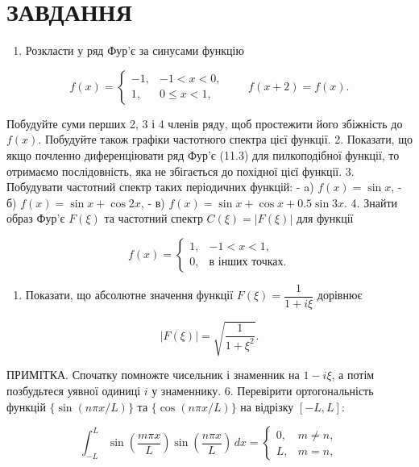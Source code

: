 \documentclass[
  ukrainian,
]{article}
\providecommand{\tightlist}{%
  \setlength{\itemsep}{0pt}\setlength{\parskip}{0pt}}
\begin{document}
\section{ЗАВДАННЯ}\label{ux437ux430ux432ux434ux430ux43dux43dux44f-9}

\begin{enumerate}
\def\labelenumi{\arabic{enumi}.}
\tightlist
\item
  Розкласти у ряд Фур'є за синусами функцію
\end{enumerate}

\[
f(x)=
\begin{cases}
-1, & -1 < x < 0,\\
1, & 0 \le x < 1,
\end{cases}
\qquad
f(x+2)=f(x).
\]

Побудуйте суми перших 2, 3 і 4 членів ряду, щоб простежити його
збіжність до \(f(x)\). Побудуйте також графіки частотного спектра цієї
функції. 2. Показати, що якщо почленно диференціювати ряд Фур'є (11.3)
для пилкоподібної функції, то отримаємо послідовність, яка не збігається
до похідної цієї функції. 3. Побудувати частотний спектр таких
періодичних функцій: - a) \(f(x)=\sin x\), - б) \(f(x)=\sin x+\cos 2x\),
- в) \(f(x)=\sin x+\cos x+0.5\sin 3x\). 4. Знайти образ Фур'є \(F(\xi)\)
та частотний спектр \(C(\xi)=|F(\xi)|\) для функції

\[
f(x)=
\begin{cases}
1, & -1 < x < 1,\\
0, & \text{в інших точках.}
\end{cases}
\]

\begin{enumerate}
\def\labelenumi{\arabic{enumi}.}
\setcounter{enumi}{4}
\tightlist
\item
  Показати, що абсолютне значення функції \(F(\xi)=\dfrac{1}{1+i\xi}\)
  дорівнює
\end{enumerate}

\[
\left|F(\xi)\right| = \sqrt{\frac{1}{1+\xi^2}}.
\]

ПРИМІТКА. Спочатку помножте чисельник і знаменник на \(1-i\xi\), а потім
позбудьтеся уявної одиниці \(i\) у знаменнику. 6. Перевірити
ортогональність функцій \(\{\sin(n\pi x/L)\}\) та \(\{\cos(n\pi x/L)\}\)
на відрізку \([-L,L]\):

\[
\int_{-L}^{L} \sin\!\left(\frac{m\pi x}{L}\right)\sin\!\left(\frac{n\pi x}{L}\right)\,dx =
\begin{cases}
0, & m \neq n,\\
L, & m = n,
\end{cases}
\]
\end{document}
